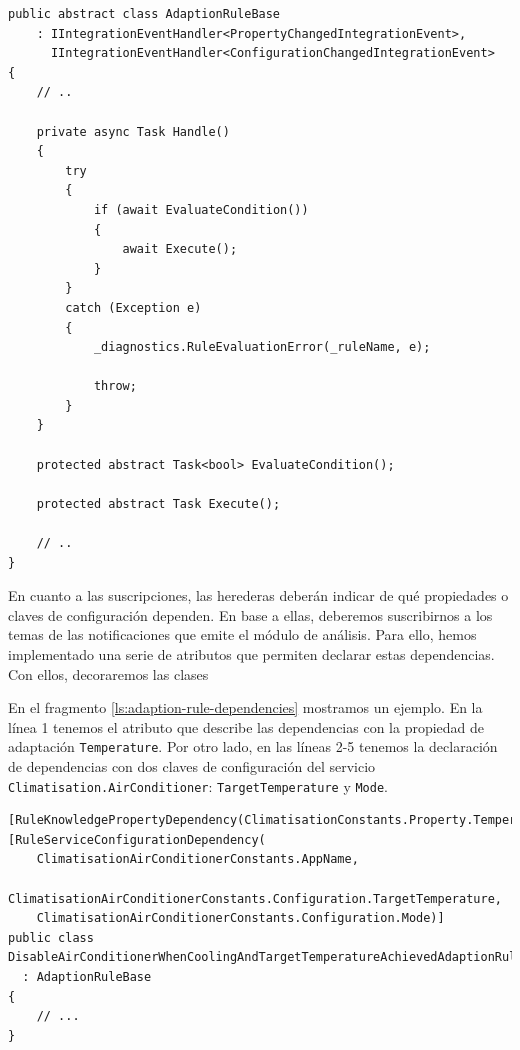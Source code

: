 \begin{lstlisting}[language={[Sharp]C},caption={Clase base para implementar reglas de adaptación. Se evalúa la condición, y si esta se cumple, se ejecuta.},captionpos=b, label=ls:adaption-rule-base]
public abstract class AdaptionRuleBase
    : IIntegrationEventHandler<PropertyChangedIntegrationEvent>,
      IIntegrationEventHandler<ConfigurationChangedIntegrationEvent>
{
    // ..

    private async Task Handle()
    {
        try
        {
            if (await EvaluateCondition())
            {
                await Execute();
            }
        }
        catch (Exception e)
        {
            _diagnostics.RuleEvaluationError(_ruleName, e);

            throw;
        }
    }

    protected abstract Task<bool> EvaluateCondition();

    protected abstract Task Execute();

    // ..
}
\end{lstlisting}

En cuanto a las suscripciones, las herederas deberán indicar de qué propiedades o claves de configuración dependen. En base a ellas, deberemos suscribirnos a los temas de las notificaciones que emite el módulo de análisis. Para ello, hemos implementado una serie de atributos que permiten declarar estas dependencias. Con ellos, decoraremos las clases

En el fragmento \ref{ls:adaption-rule-dependencies} mostramos un ejemplo. En la línea 1 tenemos el atributo que describe las dependencias con la propiedad de adaptación \texttt{Temperature}. Por otro lado, en las líneas 2-5 tenemos la declaración de dependencias con dos claves de configuración del servicio \texttt{Climatisation.AirConditioner}: \texttt{TargetTemperature} y \texttt{Mode}.

\begin{lstlisting}[language={[Sharp]C},caption={Las reglas declaran sus dependencias sobre propiedades de adaptación usando atributos. Estos se utilizarán para las suscripciones a los temas de los eventos.},captionpos=b, label=ls:adaption-rule-dependencies]
[RuleKnowledgePropertyDependency(ClimatisationConstants.Property.Temperature)]
[RuleServiceConfigurationDependency(
    ClimatisationAirConditionerConstants.AppName,
    ClimatisationAirConditionerConstants.Configuration.TargetTemperature,
    ClimatisationAirConditionerConstants.Configuration.Mode)]
public class DisableAirConditionerWhenCoolingAndTargetTemperatureAchievedAdaptionRule
  : AdaptionRuleBase
{
    // ...
}
\end{lstlisting}

